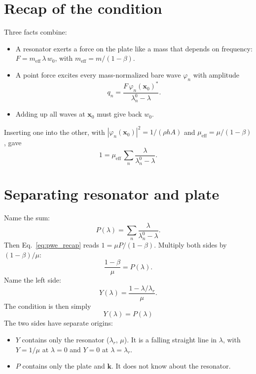 \section{Recap of the condition}

Three facts combine:
\begin{itemize}
  \item A resonator exerts a force on the plate like a mass that depends on
        frequency: $F = m_\mathrm{eff}\,\lambda\, w_0$, with
        $m_\mathrm{eff} = m/(1-\beta)$.
  \item A point force excites every mass-normalized bare wave $\varphi_n$ with
        amplitude
        \[ q_n = \frac{F\,\varphi_n(\mathbf{x}_0)^*}{\lambda_n^0 - \lambda} . \]
  \item Adding up all waves at $\mathbf{x}_0$ must give back $w_0$.
\end{itemize}
Inserting one into the other, with
$|\varphi_n(\mathbf{x}_0)|^2 = 1/(\rho h A)$ and
$\mu_\mathrm{eff} = \mu/(1-\beta)$, gave
\begin{equation}
  1 = \mu_\mathrm{eff}\,\sum_n \frac{\lambda}{\lambda_n^0 - \lambda} .
  \label{eq:pwe_recap}
\end{equation}

\section{Separating resonator and plate}

Name the sum:
\begin{equation}
  P(\lambda) = \sum_n \frac{\lambda}{\lambda_n^0 - \lambda} .
  \label{eq:plate_curve}
\end{equation}
Then Eq.~\eqref{eq:pwe_recap} reads $1 = \mu P/(1-\beta)$. Multiply both sides
by $(1-\beta)/\mu$:
\begin{equation}
  \frac{1-\beta}{\mu} = P(\lambda) .
\end{equation}
Name the left side:
\begin{equation}
  Y(\lambda) = \frac{1 - \lambda/\lambda_r}{\mu} .
  \label{eq:resonator_line}
\end{equation}
The condition is then simply
\begin{equation}
  \boxed{\;Y(\lambda) = P(\lambda)\;}
  \label{eq:Y_equals_P}
\end{equation}
The two sides have separate origins:
\begin{itemize}
  \item $Y$ contains only the resonator ($\lambda_r$, $\mu$). It is a falling
        straight line in $\lambda$, with $Y = 1/\mu$ at $\lambda = 0$ and
        $Y = 0$ at $\lambda = \lambda_r$.
  \item $P$ contains only the plate and $\mathbf{k}$. It does not know about
        the resonator.
\end{itemize}

